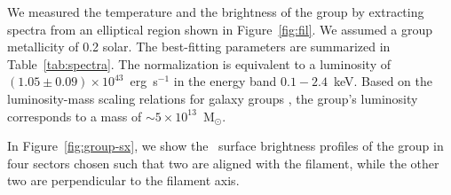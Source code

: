 We measured the temperature and the brightness of the group by extracting spectra from an elliptical region shown in Figure~\ref{fig:fil}. We assumed a group metallicity of 0.2 solar. The best-fitting parameters are summarized in Table~\ref{tab:spectra}. The normalization is equivalent to a luminosity of $(1.05\pm 0.09) \times 10^{43}$~erg~s$^{-1}$ in the energy band $0.1-2.4$~keV. Based on the luminosity-mass scaling relations for galaxy groups \citep[e.g.,][]{Connor2014}, the group's luminosity corresponds to a mass of $\sim 5\times 10^{13}$~M$_\odot$.

In Figure~\ref{fig:group-sx}, we show the \chandra\ surface brightness profiles of the group in four sectors chosen such that two are aligned with the filament, while the other two are perpendicular to the filament axis. 
